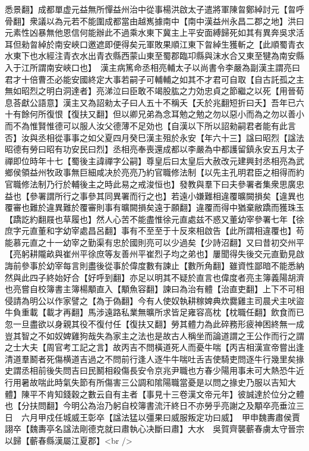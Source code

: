 悉景翻】成都單虚元益無所憚益州治中從事楊洪啟太子遣將軍陳曶鄭綽討元【曶呼骨翻】衆議以為元若不能圍成都當由越嶲據南中【南中漢益州永昌二郡之地】洪曰元素性凶暴無他恩信何能辦此不過乘水東下冀主上平安面縛歸死如其有異奔吳求活耳但勑曶綽於南安峽口邀遮即便得矣元軍敗果順江東下曶綽生獲斬之【此順蜀青衣水東下也水經注青衣水出青衣縣西蒙山東至蜀郡臨卭縣與沫水合又東至犍為南安縣入于江所謂南安峽口也】　漢主病篤命丞相亮輔太子以尚書令李嚴為副漢主謂亮曰君才十倍曹丕必能安國終定大事若嗣子可輔輔之如其不才君可自取【自古託孤之主無如昭烈之明白洞達者】亮涕泣曰臣敢不竭股肱之力効忠貞之節繼之以死【用晉荀息荅獻公語意】漢主又為詔勑太子曰人五十不稱夭【夭於兆翻短折曰夭】吾年已六十有餘何所復恨【復扶又翻】但以卿兄弟為念耳勉之勉之勿以惡小而為之勿以善小而不為惟賢惟德可以服人汝父德薄不足効也【自漢以下所以詔勑嗣君者能有此言否】汝與丞相從事事之如父夏四月癸巳漢主殂於永安【年六十三】諡曰昭烈【諡法昭德有勞曰昭有功安民曰烈】丞相亮奉喪還成都以李嚴為中都護留鎮永安五月太子禪即位時年十七【蜀後主諱禪字公嗣】尊皇后曰太皇后大赦改元建興封丞相亮為武鄉侯領益州牧政事無巨細咸决於亮亮乃約官職修法制【以先主孔明君臣之相得而約官職修法制乃行於輔後主之時此易之戒浚恒也】發教與羣下曰夫參署者集衆思廣忠益也【參署謂所行之事參其同異署而行之也】若遠小嫌難相違覆曠闕損矣【違異也覆審也難於違異難於覆審則事有曠闕損矣遠于願翻】違覆而得中猶棄敝蹻而獲珠玉【蹻訖約翻屐也草履也】然人心苦不能盡惟徐元直處兹不惑又董幼宰參署七年【徐庶字元直董和字幼宰處昌呂翻】事有不至至于十反來相啟告【此所謂相違覆也】苟能慕元直之十一幼宰之勤渠有忠於國則亮可以少過矣【少詩沼翻】又曰昔初交州平【亮躬耕隴畝與崔州平徐庶等友善州平崔烈子均之弟也】屢聞得失後交元直勤見啟誨前參事於幼宰每言則盡後從事於偉度數有諫止【數所角翻】雖資性鄙暗不能悉納然與此四子終始好合【好呼到翻】亦足以明其不疑於直言也偉度者亮主簿義陽胡濟也亮嘗自校簿書主簿楊顒直入【顒魚容翻】諫曰為治有體【治直吏翻】上下不可相侵請為明公以作家譬之【為于偽翻】今有人使奴執耕稼婢典炊爨雞主司晨犬主吠盜牛負重載【載才再翻】馬涉遠路私業無曠所求皆足雍容高枕【枕職任翻】飲食而已忽一旦盡欲以身親其役不復付任【復扶又翻】勞其體力為此碎務形疲神困終無一成豈其智之不如奴婢雞狗哉失為家主之法也是故古人稱坐而論道謂之王公作而行之謂之士大夫【周官考工記之言】故丙吉不問橫道死人而憂牛喘【丙吉相漢宣帝嘗出逢清道羣鬭者死傷横道吉過之不問前行逢人逐牛牛喘吐舌吉使騎吏問逐牛行幾里矣掾史謂丞相前後失問吉曰民鬭相殺傷長安令京兆尹職也方春少陽用事未可大熱恐牛近行用暑故喘此時氣失節有所傷害三公調和隂陽職當憂是以問之掾史乃服以吉知大體】陳平不肯知錢穀之數云自有主者【事見十三卷漢文帝元年】彼誠達於位分之體也【分扶問翻】今明公為治乃躬自校簿書流汗終日不亦勞乎亮謝之及顒卒亮垂泣三日　六月甲戍任城威王彰卒【諡法猛以彊果曰威服叛定功曰威】　甲申魏夀肅侯賈詡卒【魏夀亭名諡法剛德克就曰肅執心决斷曰肅】大水　吳賀齊襲蘄春虜太守晉宗以歸【蘄春縣漢屬江夏郡】<br />
